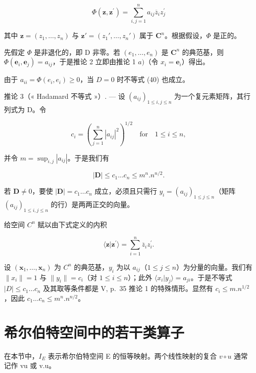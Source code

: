 \[
\Phi (\mathbf {z}, \mathbf {z} ^ {\prime}) = \sum_ {i, j = 1} ^ {n} a _ {i j} \overline {{{{z}}}} _ {i} z _ {j} ^ {\prime}
\]

其中 \(\mathbf{z} = (z_1, \dots, z_n)\) 与 \(\mathbf{z}' = (z_1', \dots, z_n')\) 属于 \(\mathbf{C}^n\)。根据假设，\(\Phi\) 是正的。

先假定 \(\Phi\) 是非退化的，即 D 非零。若 \((e_1, \ldots, e_n)\) 是 \(\mathbf{C}^n\) 的典范基，则 \(\Phi(\mathbf{e}_i, \mathbf{e}_j) = a_{ij}\)，于是推论 2 立即由推论 1 \(a)\)（令 \(x_i = \mathbf{e}_i\)）得出。

由于 \(a_{ii} = \Phi(e_i, e_i) \geqslant 0\)，当 \(D = 0\) 时不等式 (40) 也成立。

推论 3（« Hadamard 不等式 »）. --- 设 \((a_{ij})_{1 \leqslant i,j \leqslant n}\) 为一个复元素矩阵，其行列式为 D。令

\[
c _ {i} = \left(\sum_ {j = 1} ^ {n} | a _ {i j} | ^ {2}\right) ^ {1 / 2} \quad \text {for} \quad 1 \leqslant i \leqslant n,
\]

并令 \(m = \sup_{i,j}|a_{ij}|\)。于是我们有

\[
| \mathbf {D} | \leqslant c _ {1} \dots c _ {n} \leqslant m ^ {n}. n ^ {n / 2}.\tag{41}
\]

若 \(\mathbf{D} \neq 0\)，要使 \(|\mathbf{D}| = c_1 \ldots c_n\) 成立，必须且只需行 \(y_i = (a_{ij})_{1 \leqslant j \leqslant n}\)（矩阵 \((a_{ij})_{1 \leqslant i,j \leqslant n}\) 的行）是两两正交的向量。

给空间 \(C^{n}\) 赋以由下式定义的内积

\[
\langle \mathbf {z} | \mathbf {z} ^ {\prime} \rangle = \sum_ {i = 1} ^ {n} \overline {{z}} _ {i} z _ {i} ^ {\prime}.
\]

设 \((\mathbf{x}_{1},\ldots,\mathbf{x}_{n})\) 为 \(C^{n}\) 的典范基，\(y_{i}\) 为以 \(a_{ij}\)（\(1\leqslant j\leqslant n\)）为分量的向量。我们有 \(\|x_{i}\|=1\) 与 \(\|y_{i}\|=c_{i}\)（对 \(1\leqslant i\leqslant n\)）；此外 \(\langle x_{i}|y_{j}\rangle=a_{ji}\)。于是不等式 \(|D|\leqslant c_{1}\ldots c_{n}\) 及其取等条件都是 V, p.~35 推论 1 的特殊情形。显然有 \(c_{i}\leqslant m.n^{1/2}\)，因此 \(c_{1}\ldots c_{n}\leqslant m^{n}.n^{n/2}\)。

\section{希尔伯特空间中的若干类算子}

在本节中，\(I_{E}\) 表示希尔伯特空间 E 的恒等映射。两个线性映射的复合 \(v \circ u\) 通常记作 vu 或 v.u。

